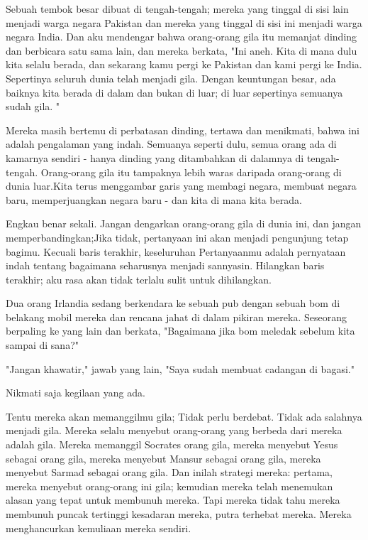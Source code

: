 Sebuah tembok besar dibuat di tengah-tengah; mereka yang tinggal di sisi lain menjadi warga negara Pakistan dan mereka yang tinggal di sisi ini menjadi warga negara India. Dan aku mendengar bahwa orang-orang gila itu memanjat dinding dan berbicara satu sama lain, dan mereka berkata, "Ini aneh. Kita di mana dulu kita selalu berada, dan sekarang kamu pergi ke Pakistan dan kami pergi ke India. Sepertinya seluruh dunia telah menjadi gila. Dengan keuntungan besar, ada baiknya kita berada di dalam dan bukan di luar; di luar sepertinya semuanya sudah gila. "

Mereka masih bertemu di perbatasan dinding, tertawa dan menikmati, bahwa ini adalah pengalaman yang indah. Semuanya seperti dulu, semua orang ada di kamarnya sendiri - hanya dinding yang ditambahkan di dalamnya di tengah-tengah. Orang-orang gila itu tampaknya lebih waras daripada orang-orang di dunia luar.Kita terus menggambar garis yang membagi negara, membuat negara baru, memperjuangkan negara baru - dan kita di mana kita berada.

Engkau benar sekali. Jangan dengarkan orang-orang gila di dunia ini, dan jangan memperbandingkan;Jika tidak, pertanyaan ini akan menjadi pengunjung tetap bagimu. Kecuali baris terakhir, keseluruhan Pertanyaanmu adalah pernyataan indah tentang bagaimana seharusnya menjadi sannyasin. Hilangkan baris terakhir; aku rasa akan tidak terlalu sulit untuk dihilangkan.

Dua orang Irlandia sedang berkendara ke sebuah pub dengan sebuah bom di belakang mobil mereka dan rencana jahat di dalam pikiran mereka.
Seseorang berpaling ke yang lain dan berkata, "Bagaimana jika bom meledak sebelum kita sampai di sana?"

"Jangan khawatir," jawab yang lain, "Saya sudah membuat cadangan di bagasi."

Nikmati saja kegilaan yang ada.

Tentu mereka akan memanggilmu gila; Tidak perlu berdebat. Tidak ada salahnya menjadi gila. Mereka selalu menyebut orang-orang yang berbeda dari mereka adalah gila. Mereka memanggil Socrates orang gila, mereka menyebut Yesus sebagai orang gila, mereka menyebut Mansur sebagai orang gila, mereka menyebut Sarmad sebagai orang gila. Dan inilah strategi mereka: pertama, mereka menyebut orang-orang ini gila; kemudian mereka telah menemukan alasan yang tepat untuk membunuh mereka. Tapi mereka tidak tahu mereka membunuh puncak tertinggi kesadaran mereka, putra terhebat mereka. Mereka menghancurkan kemuliaan mereka sendiri.







